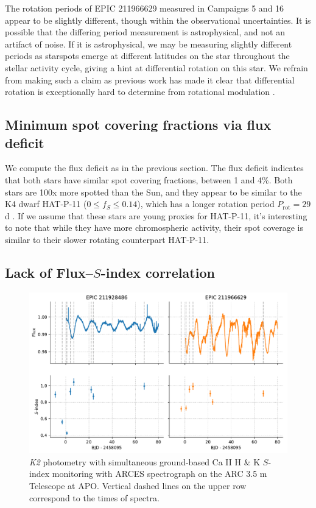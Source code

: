 The rotation periods of EPIC 211966629 measured in Campaigns 5 and 16 appear to be slightly different, though within the observational uncertainties. It is possible that the differing period measurement is astrophysical, and not an artifact of noise. If it is astrophysical, we may be measuring slightly different periods as starspots emerge at different latitudes on the star throughout the stellar activity cycle, giving a hint at differential rotation on this star. We refrain from making such a claim as previous work has made it clear that differential rotation is exceptionally hard to determine from rotational modulation \citep{Aigrain2015}.

\subsection{Minimum spot covering fractions via flux deficit}

We compute the flux deficit as in the previous section. The flux deficit indicates that both stars have similar spot covering fractions, between 1 and 4\%. Both stars are 100x more spotted than the Sun, and they appear to be similar to the K4 dwarf HAT-P-11 ($0 \leq f_S \leq 0.14$), which has a longer rotation period $P_\mathrm{rot} = 29$ d \citep{Morris2017a, Morris2018d}. If we assume that these stars are young proxies for HAT-P-11, it's interesting to note that while they have more chromospheric activity, their spot coverage is similar to their slower rotating counterpart HAT-P-11. 

\subsection{Lack of Flux--$S$-index correlation}

\begin{figure}
    \centering
    \includegraphics[scale=0.7]{nephelion/photometry_sindices.pdf}
    \caption{{\it K2} photometry with simultaneous ground-based Ca II H \& K $S$-index monitoring with ARCES spectrograph on the ARC 3.5 m Telescope at APO. Vertical dashed lines on the upper row correspond to the times of spectra. }
    \label{fig:photometry_sindices}
\end{figure}

